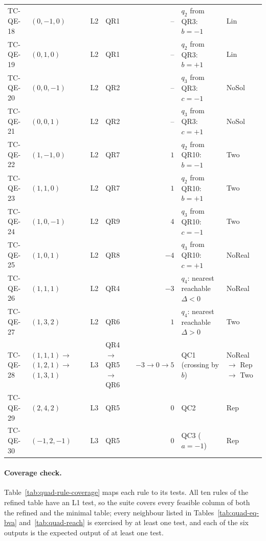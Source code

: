 \documentclass[11pt,a4paper]{article}
\begin{document}
\begin{xltabular}{\textwidth}{@{}l L{3.0cm} c L{1.9cm} r L{3.2cm} Y@{}}
TC-QE-18 & \((0,-1,0)\) & L2 & QR1 & -- & \(q_2\) from QR3: \(b=-1\) & Lin \\
TC-QE-19 & \((0,1,0)\) & L2 & QR1 & -- & \(q_2\) from QR3: \(b=+1\) & Lin \\
TC-QE-20 & \((0,0,-1)\) & L2 & QR2 & -- & \(q_3\) from QR3: \(c=-1\) & NoSol \\
TC-QE-21 & \((0,0,1)\) & L2 & QR2 & -- & \(q_3\) from QR3: \(c=+1\) & NoSol \\
TC-QE-22 & \((1,-1,0)\) & L2 & QR7 & \(1\) & \(q_2\) from QR10: \(b=-1\) & Two \\
TC-QE-23 & \((1,1,0)\) & L2 & QR7 & \(1\) & \(q_2\) from QR10: \(b=+1\) & Two \\
TC-QE-24 & \((1,0,-1)\) & L2 & QR9 & \(4\) & \(q_3\) from QR10: \(c=-1\) & Two \\
TC-QE-25 & \((1,0,1)\) & L2 & QR8 & \(-4\) & \(q_3\) from QR10: \(c=+1\) & NoReal \\
TC-QE-26 & \((1,1,1)\) & L2 & QR4 & \(-3\) & \(q_4\): nearest reachable \(\Delta<0\) & NoReal \\
TC-QE-27 & \((1,3,2)\) & L2 & QR6 & \(1\) & \(q_4\): nearest reachable \(\Delta>0\) & Two \\
\midrule
TC-QE-28 & \((1,1,1)\)\(\to\) \((1,2,1)\)\(\to\) \((1,3,1)\) & L3 & QR4\(\to\) QR5\(\to\) QR6 & \(-3\to0\to5\) & QC1 (crossing by \(b\)) & NoReal \(\to\) Rep \(\to\) Two \\
TC-QE-29 & \((2,4,2)\) & L3 & QR5 & \(0\) & QC2 & Rep \\
TC-QE-30 & \((-1,2,-1)\) & L3 & QR5 & \(0\) & QC3 (\(a=-1\)) & Rep \\
\end{xltabular}
\endgroup

\paragraph{Coverage check.} Table~\ref{tab:quad-rule-coverage} maps each
rule to its tests. All ten rules of the refined table have an L1 test, so
the suite covers every feasible column of both the refined and the minimal
table; every neighbour listed in Tables~\ref{tab:quad-eq-bva}
and~\ref{tab:quad-reach} is exercised by at least one test, and each of the
six outputs is the expected output of at least one test.
\end{document}
